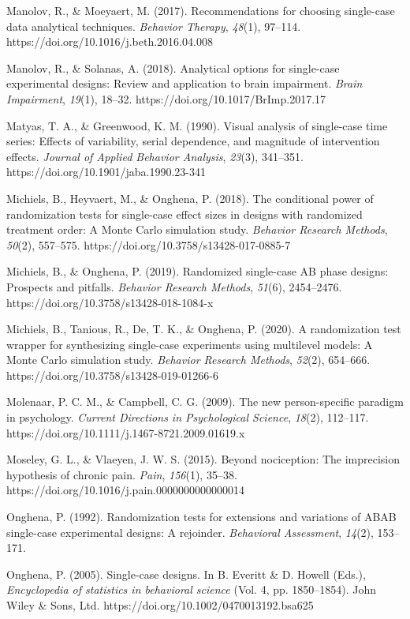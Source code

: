 \documentclass{article}
\begin{document}
Manolov, R., \& Moeyaert, M. (2017). Recommendations for choosing single-case data analytical techniques. \emph{Behavior Therapy}, \emph{48}(1), 97--114. https://doi.org/10.1016/j.beth.2016.04.008

Manolov, R., \& Solanas, A. (2018). Analytical options for single-case experimental designs: Review and application to brain impairment. \emph{Brain Impairment}, \emph{19}(1), 18--32. https://doi.org/10.1017/BrImp.2017.17

Matyas, T. A., \& Greenwood, K. M. (1990). Visual analysis of single-case time series: Effects of variability, serial dependence, and magnitude of intervention effects. \emph{Journal of Applied Behavior Analysis}, \emph{23}(3), 341--351. https://doi.org/10.1901/jaba.1990.23-341

Michiels, B., Heyvaert, M., \& Onghena, P. (2018). The conditional power of randomization tests for single-case effect sizes in designs with randomized treatment order: A Monte Carlo simulation study. \emph{Behavior Research Methods}, \emph{50}(2), 557--575. https://doi.org/10.3758/s13428-017-0885-7

Michiels, B., \& Onghena, P. (2019). Randomized single-case AB phase designs: Prospects and pitfalls. \emph{Behavior Research Methods}, \emph{51}(6), 2454--2476. https://doi.org/10.3758/s13428-018-1084-x

Michiels, B., Tanious, R., De, T. K., \& Onghena, P. (2020). A randomization test wrapper for synthesizing single-case experiments using multilevel models: A Monte Carlo simulation study. \emph{Behavior Research Methods}, \emph{52}(2), 654--666. https://doi.org/10.3758/s13428-019-01266-6

Molenaar, P. C. M., \& Campbell, C. G. (2009). The new person-specific paradigm in psychology. \emph{Current Directions in Psychological Science}, \emph{18}(2), 112--117. https://doi.org/10.1111/j.1467-8721.2009.01619.x

Moseley, G. L., \& Vlaeyen, J. W. S. (2015). Beyond nociception: The imprecision hypothesis of chronic pain. \emph{Pain}, \emph{156}(1), 35--38. https://doi.org/10.1016/j.pain.0000000000000014

Onghena, P. (1992). Randomization tests for extensions and variations of ABAB single-case experimental designs: A rejoinder. \emph{Behavioral Assessment}, \emph{14}(2), 153--171.

Onghena, P. (2005). Single-case designs. In B. Everitt \& D. Howell (Eds.), \emph{Encyclopedia of statistics in behavioral science} (Vol. 4, pp. 1850--1854). John Wiley \& Sons, Ltd. https://doi.org/10.1002/0470013192.bsa625
\end{document}
